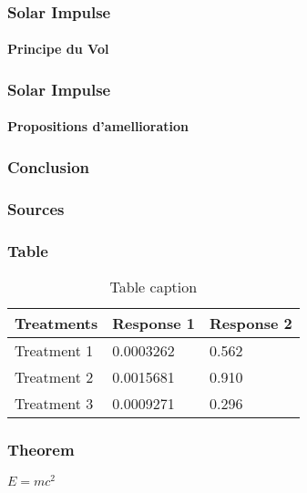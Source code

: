 \documentclass{beamer}
\begin{document}
\begin{frame}
\frametitle{Solar Impulse}
\framesubtitle{Principe du Vol}




\end{frame}


\begin{frame}
\frametitle{Solar Impulse}
\framesubtitle{Propositions d'amellioration}




\end{frame}

\begin{frame}
\frametitle{Conclusion}





\end{frame}

\begin{frame}
\frametitle{Sources}





\end{frame}
\begin{frame}
\frametitle{Table}
\begin{table}
\begin{tabular}{l l l}
\toprule
\textbf{Treatments} & \textbf{Response 1} & \textbf{Response 2}\\
\midrule
Treatment 1 & 0.0003262 & 0.562 \\
Treatment 2 & 0.0015681 & 0.910 \\
Treatment 3 & 0.0009271 & 0.296 \\
\bottomrule
\end{tabular}
\caption{Table caption}
\end{table}
\end{frame}


\begin{frame}
\frametitle{Theorem}
\begin{theorem}
$E = mc^2$
\end{theorem}
\end{frame}
\end{document}
